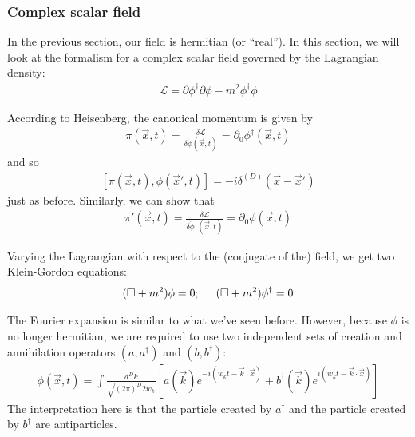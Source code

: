 \documentclass{book}
\theoremstyle{definition}
\newcommand{\p}{\partial}
\newcommand{\lag}{\mathcal{L}}
\newcommand{\f}[2]{\frac{#1}{#2}}
\newcommand{\lb}{\left[}
\newcommand{\rb}{\right]}
\begin{document}
\subsubsection{Complex scalar field}

In the previous section, our field is hermitian (or ``real''). In this section, we will look at the formalism for a complex scalar field governed by the Lagrangian density:
\begin{align}
\boxed{\lag = \p \phi^\dagger \p \phi - m^2 \phi^\dagger \phi}
\end{align} 

According to Heisenberg, the canonical momentum is given by
\begin{align}
{\pi(\vec{x},t) = \f{\delta \lag}{\delta \dot{\phi}(\vec{x},t)} = \p_0 \phi^\dagger(\vec{x},t)}
\end{align}
and so 
\begin{align}
{[\pi(\vec{x},t), \phi(\vec{x}',t)] = -i\delta^{(D)}(\vec{x} - \vec{x}')}
\end{align}
just as before. Similarly, we can show that 
\begin{align}
{\pi'(\vec{x},t) = \f{\delta \lag}{\delta \dot{\phi}^\dagger(\vec{x},t)} = \p_0 \phi(\vec{x},t)}
\end{align}

Varying the Lagrangian with respect to the (conjugate of the) field, we get two Klein-Gordon equations:
\begin{align}
{(\square + m^2)\phi = 0; \hspace{0.5cm}(\square + m^2)\phi^\dagger = 0}
\end{align}
 
The Fourier expansion is similar to what we've seen before. However, because $\phi$ is no longer hermitian, we are required to use two independent sets of creation and annihilation operators $(a,a^\dagger)$ and $(b, b^\dagger)$:
\begin{align}
\boxed{\phi(\vec{x},t) = \int \f{d^Dk}{\sqrt{(2\pi)^D 2w_k}}\lb a(\vec{k})e^{-i(w_k t - \vec{k}\cdot\vec{x})} + b^\dagger(\vec{k}) e^{i(w_k t - \vec{k}\cdot\vec{x})}\rb}
\end{align}
The interpretation here is that the particle created by $a^\dagger$ and the particle created by $b^\dagger$ are antiparticles. 
\end{document}
